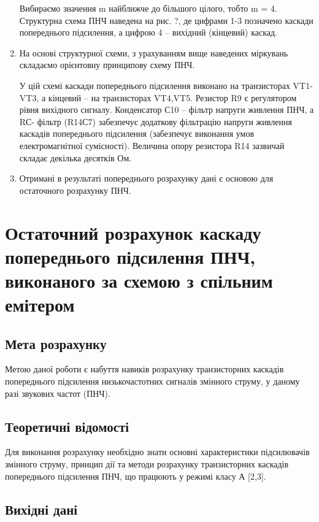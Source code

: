 \documentclass[main.tex]{subfiles}
\begin{document}
\begin{enumerate}
Вибираємо значення m найближче до більшого цілого, тобто m = 4.
Структурна схема ПНЧ наведена на рис. ?, де цифрами 1-3 позначено каскади
попереднього підсилення, а цифрою 4 – вихідний (кінцевий) каскад.



\item На основі структурної схеми, з урахуванням вище наведених
міркувань складаємо орієнтовну принципову схему ПНЧ.

У цій схемі каскади попереднього підсилення виконано на транзисторах
VT1- VT3, а кінцевий – на транзисторах VT4,VT5. Резистор R9 є регулятором рівня вихідного сигналу. Конденсатор С10 – фільтр напруги живлення ПНЧ, а RС- фільтр (R14С7) забезпечує додаткову фільтрацію напруги живлення каскадів попереднього підсилення (забезпечує виконання умов електромагнітної сумісності). Величина опору резистора R14 зазвичай складає декілька десятків Ом.

\item Отримані в результаті попереднього розрахунку дані є основою для
остаточного розрахунку ПНЧ.
\end{enumerate}

\section{Остаточний розрахунок каскаду попереднього підсилення ПНЧ, виконаного за схемою з спільним емітером}

\subsection{Мета розрахунку}

Метою даної роботи є набуття навиків розрахунку транзисторних каскадів
попереднього підсилення низькочастотних сигналів змінного струму, у даному
разі звукових частот (ПНЧ).

\subsection{Теоретичні відомості}

Для виконання розрахунку необхідно знати основні характеристики
підсилювачів змінного струму, принцип дії та методи розрахунку транзисторних
каскадів попереднього підсилення ПНЧ, що працюють у режимі класу А [2,3].

\subsection{Вихідні дані}
\end{document}
